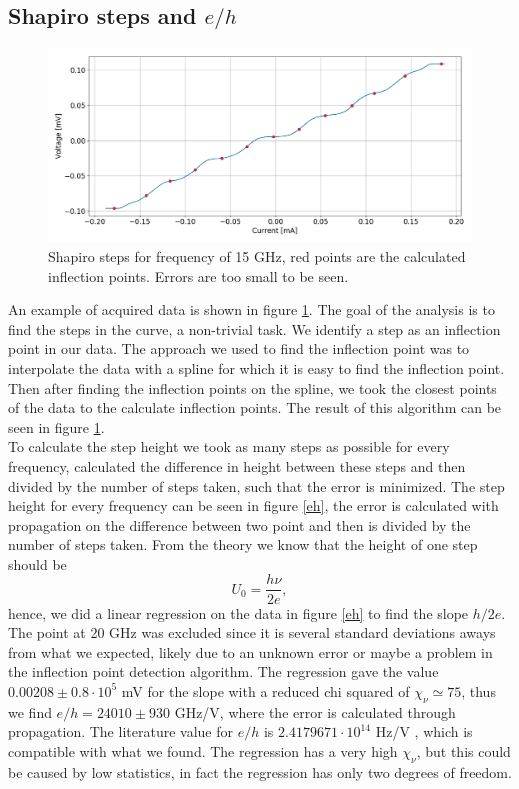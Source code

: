 \documentclass[a4paper,10pt]{article}
\begin{document}
\subsection{Shapiro steps and $e/h$}
\begin{figure}[H]
\centering
\includegraphics[width = \textwidth]{shapirosteps}
\caption{Shapiro steps for frequency of 15 GHz, red points are the calculated inflection points. Errors are too small to be seen.}\label{shapiro}
\end{figure}
An example of acquired data is shown in figure \ref{shapiro}. The goal of the analysis is to find the steps in the curve, a non-trivial task. We identify a step as an inflection point in our data. The approach we used to find the inflection point was to interpolate the data with a spline for which it is easy to find the inflection point. Then after finding the inflection points on the spline, we took the closest points of the data to the calculate inflection points. The result of this algorithm can be seen in figure \ref{shapiro}.\\
To calculate the step height we took as many steps as possible for every frequency, calculated the difference in height between these steps and then divided by the number of steps taken, such that the error is minimized. The step height for every frequency can be seen in figure \ref{eh}, the error is calculated with propagation on the difference between two point and then is divided by the number of steps taken. From the theory we know that the height of one step should be
\begin{equation}U_0 = \frac{h\nu}{2e},\end{equation}
hence, we did a linear regression on the data in figure \ref{eh} to find the slope $h/2e$. The point at 20 GHz was excluded since it is several standard deviations aways from what we expected, likely due to an unknown error or maybe a problem in the inflection point detection algorithm. The regression gave the value $0.00208\pm 0.8\cdot 10^5$ mV for the slope with a reduced chi squared of $\chi_\nu \simeq 75$, thus we find $e/h = 24010 \pm 930$ GHz/V, where the error is calculated through propagation. The literature value for $e/h$ is $ 2.4179671\cdot 10^{14}$ Hz/V \cite{skriptum}, which is compatible with what we found. The regression has a very high $\chi_\nu$, but this could be caused by low statistics, in fact the regression has only two degrees of freedom.
\end{document}
